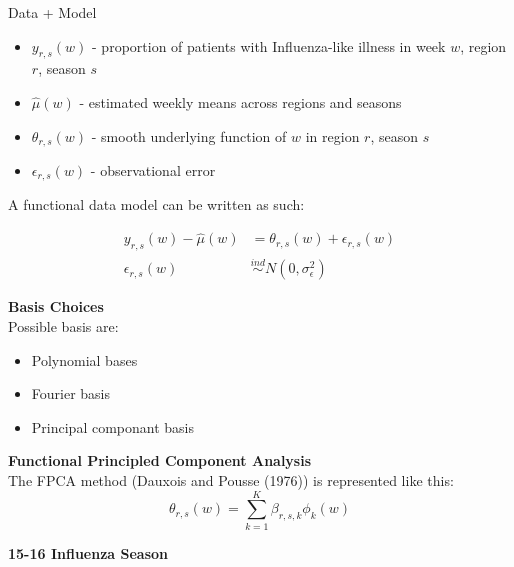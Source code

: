\documentclass[final]{beamer}
\newlength{\onecolwid}
\begin{document}
\begin{frame}[t]
\begin{columns}[t]
\begin{column}{\onecolwid}
\begin{block}{Data + Model}

\begin{itemize}
\item $y_{r,s}(w)$ - proportion of patients with Influenza-like illness in week $w$, region $r$, season $s$
\item $\hat{\mu}(w)$ - estimated weekly means across regions and seasons
\item $\theta_{r,s}(w)$ - smooth underlying function of $w$ in region $r$, season $s$
\item $\epsilon_{r,s}(w)$ - observational error
\end{itemize}

A functional data model can be written as such:

\begin{align}
y_{r,s}(w) - \hat{\mu}(w) &= \theta_{r,s}(w) + \epsilon_{r,s}(w) \\
\epsilon_{r,s}(w) &\overset{ind}{\sim} N(0,\sigma^2_{\epsilon}) \nonumber
\end{align}

\vspace{10mm}

\textbf{Basis Choices} \\

Possible basis are: \\

\begin{itemize}
\item Polynomial bases
\item Fourier basis
\item Principal componant basis \\
\end{itemize}

\vspace{10mm}

\textbf{Functional Principled Component Analysis} \\

The FPCA method (Dauxois and Pousse (1976)) is represented like this:
\begin{equation}
  \theta_{r,s} (w) = \sum_{k=1}^{K} \beta_{r,s,k} \phi_k (w)
\end{equation}



\textbf{15-16 Influenza Season}

\end{block}



\end{column}
\end{columns}
\end{frame}
\end{document}
